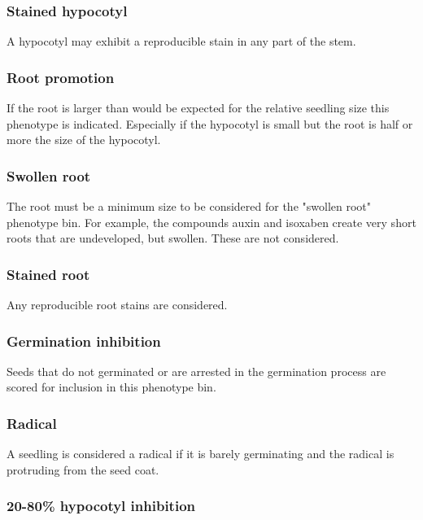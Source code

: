\subsubsection{Stained hypocotyl}

A hypocotyl may exhibit a reproducible stain in any part of the stem.

\subsubsection{Root promotion}

If the root is larger than would be expected for the relative seedling size this phenotype is indicated. Especially if the hypocotyl is small but the root is half or more the size of the hypocotyl. 

\subsubsection{Swollen root}

The root must be a minimum size to be considered for the "swollen root" phenotype bin. For example, the compounds auxin and isoxaben create very short roots that are undeveloped, but swollen. These are not considered.

\subsubsection{Stained root}

Any reproducible root stains are considered.

\subsubsection{Germination inhibition}

Seeds that do not germinated or are arrested in the germination process are scored for inclusion in this phenotype bin.

\subsubsection{Radical}

A seedling is considered a radical if it is barely germinating and the radical is protruding from the seed coat.

\subsubsection{20-80{\%} hypocotyl inhibition}

